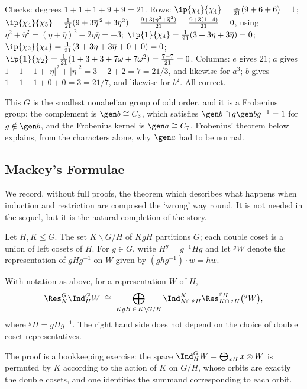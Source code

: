 Checks: degrees $1+1+1+9+9 = 21$. Rows: $\ip{\chi_4}{\chi_4} = \frac1{21}(9+6+6) = 1$; $\ip{\chi_4}{\chi_5} = \frac1{21}(9 + 3\overline\eta^{\,2}+3\eta^2) = \frac{9 + 3(\eta^2+\overline\eta^2)}{21} = \frac{9+3(1-4)}{21} = 0$, using $\eta^2+\overline\eta^2 = (\eta+\overline\eta)^2 - 2\eta\overline\eta = -3$; $\ip{\mathbf1}{\chi_4} = \frac1{21}(3+3\eta+3\overline\eta) = 0$; $\ip{\chi_2}{\chi_4} = \frac1{21}(3+3\eta+3\overline\eta+0+0) = 0$; $\ip{\mathbf1}{\chi_2} = \frac1{21}(1+3+3+7\omega+7\omega^2) = \frac{7 - 7}{21} = 0$. Columns: $e$ gives $21$; $a$ gives $1+1+1+|\eta|^2+|\overline\eta|^2 = 3+2+2 = 7 = 21/3$, and likewise for $a^3$; $b$ gives $1+1+1+0+0 = 3 = 21/7$, and likewise for $b^2$. All correct.

\begin{remark}
	This $G$ is the smallest nonabelian group of odd order, and it is a Frobenius group: the complement is $\gen b\cong C_3$, which satisfies $\gen b\cap g\gen bg^{-1} = 1$ for $g\notin\gen b$, and the Frobenius kernel is $\gen a\cong C_7$. Frobenius' theorem below explains, from the characters alone, why $\gen a$ had to be normal.
\end{remark}

\subsection{Mackey's Formulae}

We record, without full proofs, the theorem which describes what happens when induction and restriction are composed the `wrong' way round. It is not needed in the sequel, but it is the natural completion of the story.

Let $H, K \leq G$. The set $K\backslash G/H$ of  $KgH$ partitions $G$; each double coset is a union of left cosets of $H$. For $g \in G$, write $H^g = g^{-1}Hg$ and let ${}^gW$ denote the representation of $gHg^{-1}$ on $W$ given by $(ghg^{-1})\cdot w = hw$.

\begin{theorem}
	With notation as above, for a representation $W$ of $H$,
	$$\Res^G_K\Ind_H^GW \; \cong \; \bigoplus_{KgH\,\in\, K\backslash G/H}\Ind^K_{K\cap\, {}^gH}\Res^{{}^gH}_{K\cap\, {}^gH}\big({}^gW\big),$$
	where ${}^gH = gHg^{-1}$. The right hand side does not depend on the choice of double coset representatives.
\end{theorem}

The proof is a bookkeeping exercise: the space $\Ind_H^GW = \bigoplus_{xH}x\otimes W$ is permuted by $K$ according to the action of $K$ on $G/H$, whose orbits are exactly the double cosets, and one identifies the summand corresponding to each orbit.

